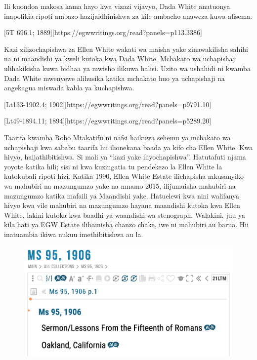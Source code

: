 Ili kuondoa makosa kama hayo kwa vizazi vijavyo, Dada White anatuonya inapofikia ripoti ambazo hazijaidhinishwa za kile ambacho anaweza kuwa alisema.


[5T 696.1; 1889][https://egwwritings.org/read?panels=p113.3386]


Kazi zilizochapishwa za Ellen White wakati wa maisha yake zinawakilisha sahihi na ni maandishi ya kweli kutoka kwa Dada White. Mchakato wa uchapishaji ulihakikisha kuwa bidhaa ya mwisho ilikuwa halisi. Uzito wa ushahidi ni kwamba Dada White mwenyewe alihusika katika mchakato huo ya uchapishaji na angekagua miswada kabla ya kuchapishwa.


[Lt133-1902.4; 1902][https://egwwritings.org/read?panels=p9791.10]


[Lt49-1894.11; 1894][https://egwwritings.org/read?panels=p5289.20]


Taarifa kwamba Roho Mtakatifu ni nafsi haikuwa sehemu ya mchakato wa uchapishaji kwa sababu taarifa hii ilionekana baada ya kifo cha Ellen White. Kwa hivyo, haijathibitishwa. Si mali ya “kazi yake iliyochapishwa”. Hatutafuti njama yoyote katika hili; sisi ni kwa kuzingatia tu pendekezo la Ellen White la kutokubali ripoti hizi. Katika 1990, Ellen White Estate ilichapisha mkusanyiko wa mahubiri na mazungumzo yake na mnamo 2015, ilijumuisha mahubiri na mazungumzo katika mafaili ya Maandishi yake. Hatuelewi kwa nini walifanya hivyo kwa vile mahubiri na mazungumzo hayana maandishi kutoka kwa Ellen White, lakini kutoka kwa baadhi ya waandishi wa stenograph. Walakini, juu ya kila hati ya EGW Estate ilibainisha chanzo chake, iwe ni mahubiri au barua. Hii inatuambia ikiwa nukuu imethibitishwa au la.


\begin{figure}
    \centering
    \includegraphics[width=1\linewidth]{images/sermons-and-talks.png}
    \label{fig:enter-label}
\end{figure}


